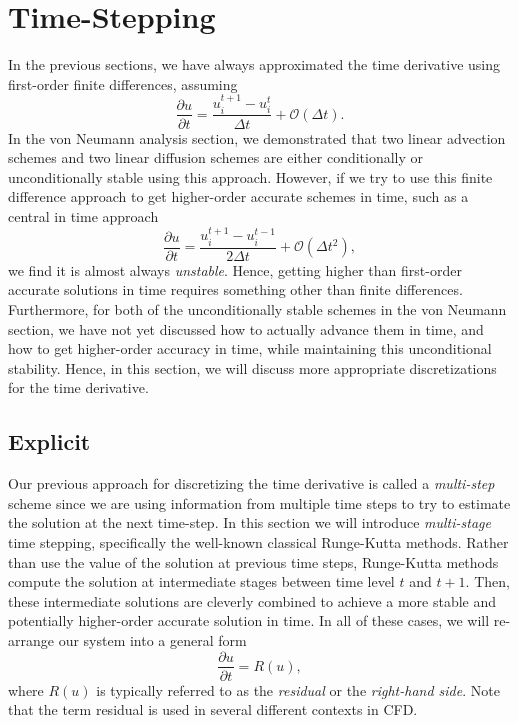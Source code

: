 \chapter{Time-Stepping}
\label{ch:timestepping}
In the previous sections, we have always approximated the time derivative using first-order finite differences, assuming
\begin{equation}
	\frac{\partial u}{\partial t} = \frac{u_i^{t+1} - u_{i}^t}{\Delta t} + \mathcal{O}(\Delta t).
\end{equation}
In the von Neumann analysis section, we demonstrated that two linear advection schemes and two linear diffusion schemes are either conditionally or unconditionally stable using this approach. However, if we try to use this finite difference approach to get higher-order accurate schemes in time, such as a central in time approach
\begin{equation}
	\frac{\partial u}{\partial t} = \frac{u_i^{t+1} - u_{i}^{t-1}}{2 \Delta t} + \mathcal{O}(\Delta t^2),
\end{equation}
we find it is almost always {\it unstable}. Hence, getting higher than first-order accurate solutions in time requires something other than finite differences. Furthermore, for both of the unconditionally stable schemes in the von Neumann section, we have not yet discussed how to actually advance them in time, and how to get higher-order accuracy in time, while maintaining this unconditional stability. Hence, in this section, we will discuss more appropriate discretizations for the time derivative.

\section{Explicit}
Our previous approach for discretizing the time derivative is called a {\it multi-step} scheme since we are using information from multiple time steps to try to estimate the solution at the next time-step. In this section we will introduce {\it multi-stage} time stepping, specifically the well-known classical Runge-Kutta methods. Rather than use the value of the solution at previous time steps, Runge-Kutta methods compute the solution at intermediate stages between time level $t$ and $t+1$. Then, these intermediate solutions are cleverly combined to achieve a more stable and potentially higher-order accurate solution in time. In all of these cases, we will re-arrange our system into a general form
\begin{equation}
	\frac{\partial u}{\partial t} = R(u),
\end{equation}
where $R(u)$ is typically referred to as the {\it residual} or the {\it right-hand side}. Note that the term residual is used in several different contexts in CFD.

